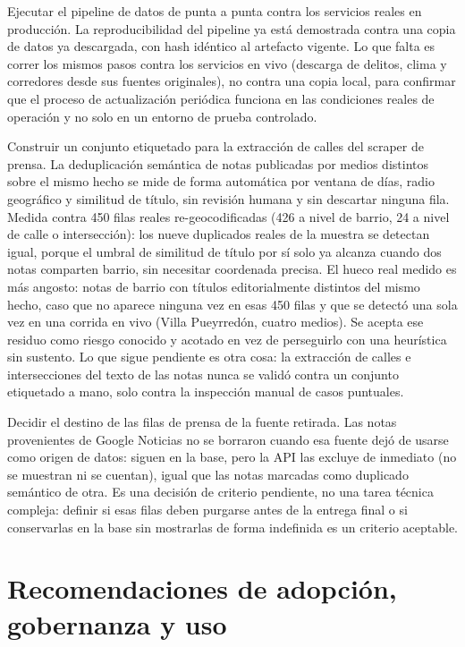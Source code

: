 Ejecutar el pipeline de datos de punta a punta contra los servicios
reales en producción. La reproducibilidad del pipeline ya está
demostrada contra una copia de datos ya descargada, con hash idéntico al
artefacto vigente. Lo que falta es correr los mismos pasos contra los
servicios en vivo (descarga de delitos, clima y corredores desde sus
fuentes originales), no contra una copia local, para confirmar que el
proceso de actualización periódica funciona en las condiciones reales de
operación y no solo en un entorno de prueba controlado.

Construir un conjunto etiquetado para la extracción de calles del
scraper de prensa. La deduplicación semántica de notas publicadas por
medios distintos sobre el mismo hecho se mide de forma automática por
ventana de días, radio geográfico y similitud de título, sin revisión
humana y sin descartar ninguna fila. Medida contra 450 filas reales
re-geocodificadas (426 a nivel de barrio, 24 a nivel de calle o
intersección): los nueve duplicados reales de la muestra se detectan
igual, porque el umbral de similitud de título por sí solo ya alcanza
cuando dos notas comparten barrio, sin necesitar coordenada precisa. El
hueco real medido es más angosto: notas de barrio con títulos
editorialmente distintos del mismo hecho, caso que no aparece ninguna
vez en esas 450 filas y que se detectó una sola vez en una corrida en
vivo (Villa Pueyrredón, cuatro medios). Se acepta ese residuo como
riesgo conocido y acotado en vez de perseguirlo con una heurística sin
sustento. Lo que sigue pendiente es otra cosa: la extracción de calles e
intersecciones del texto de las notas nunca se validó contra un conjunto
etiquetado a mano, solo contra la inspección manual de casos puntuales.

Decidir el destino de las filas de prensa de la fuente retirada. Las
notas provenientes de Google Noticias no se borraron cuando esa fuente
dejó de usarse como origen de datos: siguen en la base, pero la API las
excluye de inmediato (no se muestran ni se cuentan), igual que las notas
marcadas como duplicado semántico de otra. Es una decisión de criterio
pendiente, no una tarea técnica compleja: definir si esas filas deben
purgarse antes de la entrega final o si conservarlas en la base sin
mostrarlas de forma indefinida es un criterio aceptable.

\section{Recomendaciones de adopción, gobernanza y uso}

